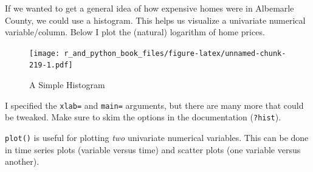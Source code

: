 \documentclass[
  12pt,
  krantz2]{krantz}
\makeatletter
\newenvironment{Shaded}{\begin{snugshade}}{\end{snugshade}}
\newcommand{\AttributeTok}[1]{\textcolor[rgb]{0.61,0.61,0.61}{#1}}
\newcommand{\DecValTok}[1]{\textcolor[rgb]{0.06,0.06,0.06}{#1}}
\newcommand{\FunctionTok}[1]{\textcolor[rgb]{0,0,0}{#1}}
\newcommand{\NormalTok}[1]{#1}
\newcommand{\SpecialCharTok}[1]{\textcolor[rgb]{0,0,0}{#1}}
\newcommand{\StringTok}[1]{\textcolor[rgb]{0.5,0.5,0.5}{#1}}
\newenvironment{kframe}{%
\medskip{}
\setlength{\fboxsep}{.8em}
 \def\at@end@of@kframe{}%
 \ifinner\ifhmode%
  \def\at@end@of@kframe{\end{minipage}}%
  \begin{minipage}{\columnwidth}%
 \fi\fi%
 \def\FrameCommand##1{\hskip\@totalleftmargin \hskip-\fboxsep
 \colorbox{shadecolor}{##1}\hskip-\fboxsep
     \hskip-\linewidth \hskip-\@totalleftmargin \hskip\columnwidth}%
 \MakeFramed {\advance\hsize-\width
   \@totalleftmargin\z@ \linewidth\hsize
   \@setminipage}}%
 {\par\unskip\endMakeFramed%
 \at@end@of@kframe}
\renewenvironment{Shaded}{\begin{kframe}}{\end{kframe}}
\makeatother
\begin{document}
If we wanted to get a general idea of how expensive homes were in Albemarle County, we could use a histogram. This helps us visualize a univariate numerical variable/column. Below I plot the (natural) logarithm of home prices.

\begin{Shaded}
\end{Shaded}

\begin{figure}
\centering
\texttt{[image: r\_and\_python\_book\_files/figure-latex/unnamed-chunk-219-1.pdf]}
\caption{\label{fig:unnamed-chunk-219}A Simple Histogram}
\end{figure}

I specified the \texttt{xlab=} and \texttt{main=} arguments, but there are many more that could be tweaked. Make sure to skim the options in the documentation (\texttt{?hist}).

\texttt{plot()} is useful for plotting \emph{two} univariate numerical variables. This can be done in time series plots (variable versus time) and scatter plots (one variable versus another).

\begin{Shaded}
\end{Shaded}
\end{document}

